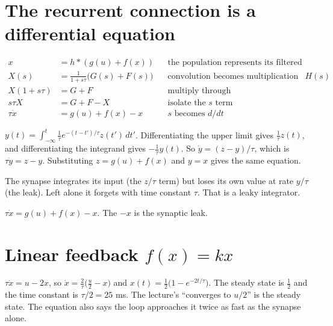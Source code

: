 \documentclass[11pt,letterpaper]{article}
\newcommand{\ans}[1]{\par\vspace{4pt}{\bfseries #1}\quad}
\begin{document}
\section{The recurrent connection is a differential equation}

\ans{Q1}
\begin{align*}
x &= h * (g(u) + f(x)) && \text{the population represents its filtered total input}\\
X(s) &= \frac{1}{1 + s\tau}\bigl(G(s) + F(s)\bigr) && \text{convolution becomes multiplication by } H(s)\\
X(1 + s\tau) &= G + F && \text{multiply through}\\
s\tau X &= G + F - X && \text{isolate the } s \text{ term}\\
\tau\dot x &= g(u) + f(x) - x && s \text{ becomes } d/dt
\end{align*}

\ans{Q2}
$y(t) = \int_{-\infty}^t \frac1\tau e^{-(t - t')/\tau}z(t')\,dt'$. Differentiating the upper limit gives $\frac1\tau z(t)$, and differentiating the integrand gives $-\frac1\tau y(t)$. So $\dot y = (z - y)/\tau$, which is $\tau\dot y = z - y$. Substituting $z = g(u) + f(x)$ and $y = x$ gives the same equation.

The synapse integrates its input (the $z/\tau$ term) but loses its own value at rate $y/\tau$ (the leak). Left alone it forgets with time constant $\tau$. That is a leaky integrator.
\begin{result}
$\tau\dot x = g(u) + f(x) - x$. The $-x$ is the synaptic leak.
\end{result}

\section{Linear feedback $f(x) = kx$}

\ans{Q1}
$\tau\dot x = u - 2x$, so $\dot x = \frac{2}{\tau}\bigl(\tfrac{u}{2} - x\bigr)$ and $x(t) = \tfrac12\bigl(1 - e^{-2t/\tau}\bigr)$. The steady state is $\tfrac12$ and the time constant is $\tau/2 = 25$ ms. The lecture's ``converges to $u/2$'' is the steady state. The equation also says the loop approaches it twice as fast as the synapse alone.
\end{document}
